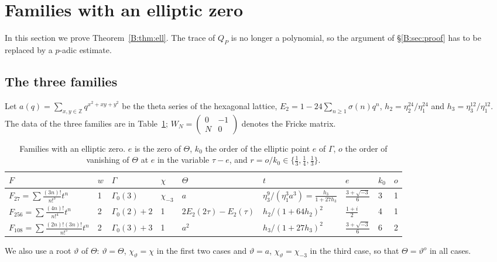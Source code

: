 \documentclass[11pt,a4paper]{article}
\theoremstyle{definition}\newtheorem{definition}[theorem]{Definition}
\theoremstyle{remark}\newtheorem{remark}[theorem]{Remark}
\newcommand{\Z}{\mathbb Z}
\newcommand{\bmat}[4]{\left(\begin{smallmatrix}#1&#2\\#3&#4\end{smallmatrix}\right)}
\numberwithin{equation}{section}
\begin{document}
\section{Families with an elliptic zero}\label{B:source-main-6}\label{B:sec:ell}

In this section we prove Theorem~\ref{B:thm:ell}. The trace of $Q_P$ is no longer a polynomial, so
the argument of \S\ref{B:sec:proof} has to be replaced by a $p$-adic estimate.

\subsection{The three families}
Let $a(q)=\sum_{x,y\in\Z}q^{x^2+xy+y^2}$ be the theta series of the hexagonal lattice, $E_2=1-24\sum_{n\ge1}\sigma(n)q^n$,
$h_2=\eta_2^{24}/\eta_1^{24}$ and $h_3=\eta_3^{12}/\eta_1^{12}$. The data of the three families are in
Table~\ref{B:tab:ell}; $W_N=\bmat0{-1}N0$ denotes the Fricke matrix.

\begin{table}[ht]
\centering\small
\renewcommand{\arraystretch}{1.3}
\begin{tabular}{@{}lllllllll@{}}
\toprule
$F$ & $w$ & $\Gamma$ & $\chi$ & $\Theta$ & $t$ & $e$ & $k_0$ & $o$\\\midrule
$F_{27}=\sum\frac{(3n)!}{n!^3}t^n$ & 1 & $\Gamma_0(3)$ & $\chi_{-3}$ & $a$ & $\eta_3^9/(\eta_1^3a^3)=\frac{h_3}{1+27h_3}$ &
$\frac{3+\sqrt{-3}}6$ & 3 & 1\\
$F_{256}=\sum\frac{(4n)!}{n!^4}t^n$ & 2 & $\Gamma_0(2)+2$ & 1 & $2E_2(2\tau)-E_2(\tau)$ & $h_2/(1+64h_2)^2$ & $\frac{1+i}2$ &
4 & 1\\
$F_{108}=\sum\frac{(2n)!(3n)!}{n!^5}t^n$ & 2 & $\Gamma_0(3)+3$ & 1 & $a^2$ & $h_3/(1+27h_3)^2$ & $\frac{3+\sqrt{-3}}6$ & 6
& 2\\\bottomrule
\end{tabular}
\caption{Families with an elliptic zero. $e$ is the zero of $\Theta$, $k_0$ the order of the elliptic point $e$ of $\Gamma$,
$o$ the order of vanishing of $\Theta$ at $e$ in the variable $\tau-e$, and $r=o/k_0\in\{\frac13,\frac14,\frac13\}$.}
\label{B:tab:ell}
\end{table}

We also use a root $\vartheta$ of $\Theta$: $\vartheta=\Theta$, $\chi_\vartheta=\chi$ in the first two cases and
$\vartheta=a$, $\chi_\vartheta=\chi_{-3}$ in the third case, so that $\Theta=\vartheta^{o}$ in all cases.
\end{document}
